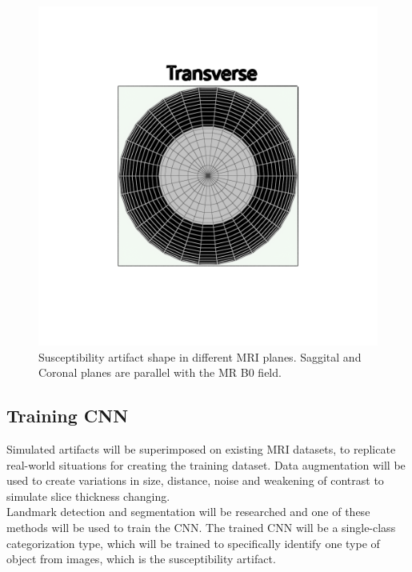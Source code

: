 \documentclass{article}
\begin{document}
\begin{figure}[h]
\begin{minipage}{0.3\textwidth}
    \end{minipage}\hfill
    \begin{minipage}{0.3\textwidth}
        \centering
        \includegraphics[width=\textwidth]{img/sus-transverse.png}
    \end{minipage}\hfill
    \caption{Susceptibility artifact shape in different MRI planes. Saggital and Coronal planes are parallel with the MR B0 field.}
    \label{fig:sus-representation}
\end{figure}

\newpage

\subsection{Training CNN}
Simulated artifacts will be superimposed on existing MRI datasets, to replicate real-world situations for creating the training dataset. Data augmentation will be used to create variations in size, distance, noise and weakening of contrast to simulate slice thickness changing.\\

Landmark detection and segmentation will be researched and one of these methods will be used to train the CNN. The trained CNN will be a single-class categorization type, which will be trained to specifically identify one type of object from images, which is the susceptibility artifact.\\
\end{document}
